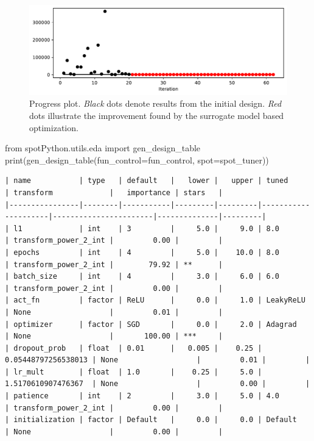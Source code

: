 \documentclass[
  letterpaper,
  DIV=11,
  numbers=noendperiod]{scrreprt}
\newenvironment{Shaded}{\begin{snugshade}}{\end{snugshade}}
\newcommand{\BuiltInTok}[1]{\textcolor[rgb]{0.00,0.23,0.31}{#1}}
\newcommand{\ImportTok}[1]{\textcolor[rgb]{0.00,0.46,0.62}{#1}}
\newcommand{\NormalTok}[1]{\textcolor[rgb]{0.00,0.23,0.31}{#1}}
\newcommand{\OperatorTok}[1]{\textcolor[rgb]{0.37,0.37,0.37}{#1}}
\begin{document}
\begin{figure}[H]

{\centering \includegraphics{033_spot_lightning_linear_sensitive_files/figure-pdf/cell-15-output-1.pdf}

}

\caption{Progress plot. \emph{Black} dots denote results from the
initial design. \emph{Red} dots illustrate the improvement found by the
surrogate model based optimization.}

\end{figure}%

\begin{Shaded}
\begin{Highlighting}[]
\ImportTok{from}\NormalTok{ spotPython.utils.eda }\ImportTok{import}\NormalTok{ gen\_design\_table}
\BuiltInTok{print}\NormalTok{(gen\_design\_table(fun\_control}\OperatorTok{=}\NormalTok{fun\_control, spot}\OperatorTok{=}\NormalTok{spot\_tuner))}
\end{Highlighting}
\end{Shaded}

\begin{verbatim}
| name           | type   | default   |   lower |   upper | tuned               | transform             |   importance | stars   |
|----------------|--------|-----------|---------|---------|---------------------|-----------------------|--------------|---------|
| l1             | int    | 3         |     5.0 |     9.0 | 8.0                 | transform_power_2_int |         0.00 |         |
| epochs         | int    | 4         |     5.0 |    10.0 | 8.0                 | transform_power_2_int |        79.92 | **      |
| batch_size     | int    | 4         |     3.0 |     6.0 | 6.0                 | transform_power_2_int |         0.00 |         |
| act_fn         | factor | ReLU      |     0.0 |     1.0 | LeakyReLU           | None                  |         0.01 |         |
| optimizer      | factor | SGD       |     0.0 |     2.0 | Adagrad             | None                  |       100.00 | ***     |
| dropout_prob   | float  | 0.01      |   0.005 |    0.25 | 0.05448797256538013 | None                  |         0.01 |         |
| lr_mult        | float  | 1.0       |    0.25 |     5.0 | 1.5170610907476367  | None                  |         0.00 |         |
| patience       | int    | 2         |     3.0 |     5.0 | 4.0                 | transform_power_2_int |         0.00 |         |
| initialization | factor | Default   |     0.0 |     0.0 | Default             | None                  |         0.00 |         |
\end{verbatim}
\end{document}
